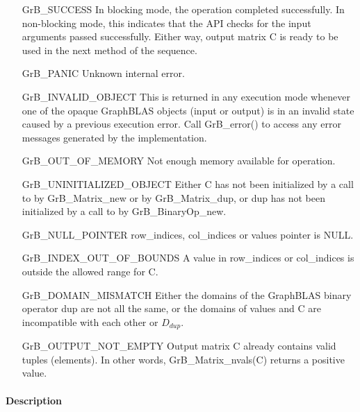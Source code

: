\begin{itemize}[leftmargin=2.1in]
    \item[{\sf GrB\_SUCCESS}]         In blocking mode, the operation completed
    successfully. In non-blocking mode, this indicates that the API checks 
    for the input arguments passed successfully. Either way, output matrix 
    {\sf C} is ready to be used in the next method of the sequence.

    \item[{\sf GrB\_PANIC}]           Unknown internal error.
    
    \item[{\sf GrB\_INVALID\_OBJECT}] This is returned in any execution mode 
    whenever one of the opaque GraphBLAS objects (input or output) is in an invalid 
    state caused by a previous execution error.  Call {\sf GrB\_error()} to access 
    any error messages generated by the implementation.

    \item[{\sf GrB\_OUT\_OF\_MEMORY}] Not enough memory available for operation.
    
    \item[{\sf GrB\_UNINITIALIZED\_OBJECT}]  Either {\sf C} has not been 
    initialized by a call to {\sf by GrB\_Matrix\_new} or 
    {\sf by GrB\_Matrix\_dup}, or
    {\sf dup} has not been initialized by a call to {\sf by GrB\_BinaryOp\_new}.
    
    \item[{\sf GrB\_NULL\_POINTER}]  {\sf row\_indices}, 
    {\sf col\_indices} or {\sf values} pointer is {\sf NULL}.

    \item[{\sf GrB\_INDEX\_OUT\_OF\_BOUNDS}] A value in {\sf row\_indices} or
    {\sf col\_indices} is outside the allowed range for {\sf C}.

	\item[{\sf GrB\_DOMAIN\_MISMATCH}]    Either the domains of the GraphBLAS 
    binary operator {\sf dup} are not all the same, or the domains of 
    {\sf values} and {\sf C} are incompatible with each other or $D_{dup}$.
	
	\item[{\sf GrB\_OUTPUT\_NOT\_EMPTY}]    Output matrix {\sf C} already contains valid tuples (elements).
	In other words, {\sf GrB\_Matrix\_nvals(C)} returns a positive value.
\end{itemize}

\paragraph{Description}


